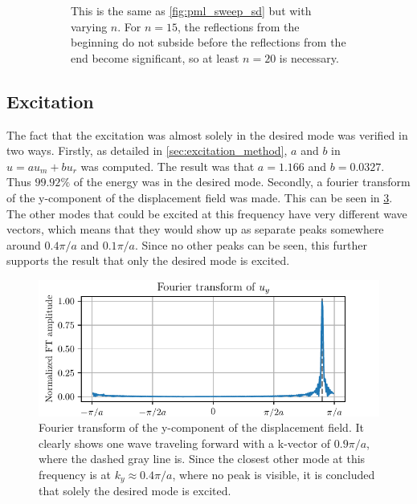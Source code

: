 \begin{figure}[htpb]
\begin{subfigure}[]{\textwidth}
\begin{center}
	\end{center}
	\caption{
		This is the same as \cref{fig:pml_sweep_sd} but with varying $n$.
		For $n=15$, the reflections from the beginning do not subside before the
		reflections from the end become significant, so at least $n=20$ is
		necessary.
	}
	\label{fig:pml_sweep_sn}
	\end{subfigure}
	\caption{}
	\label{fig:pml_sweep1}
\end{figure}

\subsection{Excitation}

The fact that the excitation was almost solely in the desired mode was verified
in two ways.
Firstly, as detailed in \cref{sec:excitation_method}, $a$ and $b$ in $u = a u_m
+ b u_r$ was computed.
The result was that $a = 1.166$ and $b = 0.0327$.
Thus $99.92\%$ of the energy was in the desired mode.
Secondly, a fourier transform of the y-component of the displacement field was
made.
This can be seen in \cref{fig:v_ft}.
The other modes that could be excited at this frequency have very different wave
vectors, which means that they would show up as separate peaks somewhere around
$0.4 \pi / a$ and $0.1 \pi / a$.
Since no other peaks can be seen, this further supports the result that only the
desired mode is excited.

\begin{figure}[htpb]
	\centering
	\includegraphics{chapters/results/ft_figure.pdf}
	\caption{%
		Fourier transform of the y-component of the displacement field.
		It clearly shows one wave traveling forward with a k-vector of
		$0.9 \pi / a$, where the dashed gray line is.
		Since the closest other mode at this frequency is at
		$k_y \approx 0.4 \pi / a$, where no peak is visible, it is concluded
		that solely the desired mode is excited.
	}%
	\label{fig:v_ft}
\end{figure}

